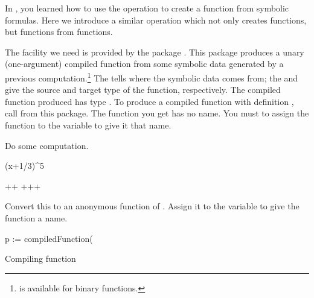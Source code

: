 
In , you learned how to use the operation
 to create a function from symbolic formulas.
Here we introduce a similar operation which not only
creates functions, but functions from functions.

The facility we need is provided by the package
.
This package produces a unary (one-argument) compiled
function from some symbolic data
generated by a previous computation.\footnote{%
 is available for binary
functions.}
The  tells where the symbolic data comes from;
the  and  give \Language{} the
source and target type of the function, respectively.
The compiled function produced  has type
.
To produce a compiled function with definition , call
 from this package.
The function you get has no name.
You must to assign the function to the variable  to give it that name.
%
\begin{xtc}
\begin{xtccomment}
Do some computation.
\end{xtccomment}
\begin{spadsrc}
(x+1/3)^5
\end{spadsrc}
\begin{TeXOutput}
\begin{fricasmath}{1}
+\TIMES {}+%
\TIMES {}+\TIMES {}+\TIMES {}+%
\end{fricasmath}
\end{TeXOutput}
\end{xtc}
\begin{xtc}
\begin{xtccomment}
Convert this to an anonymous function of .
Assign it to the variable  to give the function a name.
\end{xtccomment}
\begin{spadsrc}
p := compiledFunction(%
\end{spadsrc}
\begin{MessageOutput}
   Compiling function %
\end{MessageOutput}
\begin{TeXOutput}
\begin{fricasmath}{2}
%
\end{fricasmath}
\end{TeXOutput}
\end{xtc}
